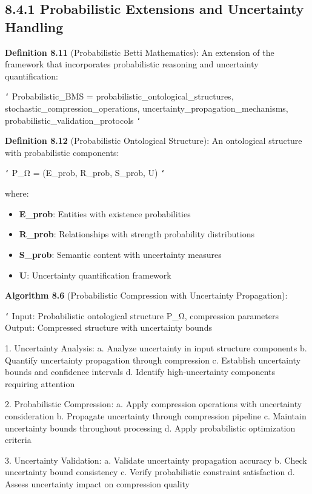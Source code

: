 \subsection{8.4.1 Probabilistic Extensions and Uncertainty Handling}

\textbf{Definition 8.11} (Probabilistic Betti Mathematics): An extension of the framework that incorporates probabilistic reasoning and uncertainty quantification:

\texttt{`}
Probabilistic_BMS = {
    probabilistic_ontological_structures,
    stochastic_compression_operations,
    uncertainty_propagation_mechanisms,
    probabilistic_validation_protocols
}
\texttt{`}

\textbf{Definition 8.12} (Probabilistic Ontological Structure): An ontological structure with probabilistic components:

\texttt{`}
P_Ω = (E_prob, R_prob, S_prob, U)
\texttt{`}

where:
\begin{itemize}
\item \textbf{E_prob}: Entities with existence probabilities
\item \textbf{R_prob}: Relationships with strength probability distributions
\item \textbf{S_prob}: Semantic content with uncertainty measures
\item \textbf{U}: Uncertainty quantification framework
\end{itemize}

\textbf{Algorithm 8.6} (Probabilistic Compression with Uncertainty Propagation):

\texttt{`}
Input: Probabilistic ontological structure P_Ω, compression parameters
Output: Compressed structure with uncertainty bounds

1. Uncertainty Analysis:
   a. Analyze uncertainty in input structure components
   b. Quantify uncertainty propagation through compression
   c. Establish uncertainty bounds and confidence intervals
   d. Identify high-uncertainty components requiring attention
   
2. Probabilistic Compression:
   a. Apply compression operations with uncertainty consideration
   b. Propagate uncertainty through compression pipeline
   c. Maintain uncertainty bounds throughout processing
   d. Apply probabilistic optimization criteria
   
3. Uncertainty Validation:
   a. Validate uncertainty propagation accuracy
   b. Check uncertainty bound consistency
   c. Verify probabilistic constraint satisfaction
   d. Assess uncertainty impact on compression quality
   
